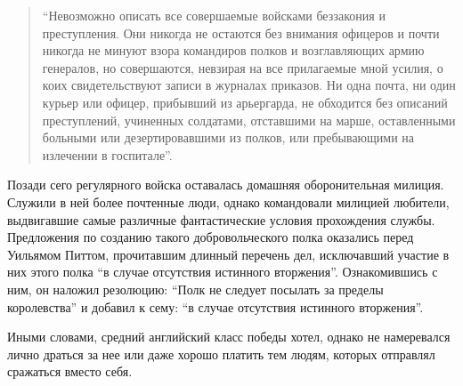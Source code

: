 \documentclass[
  oneside,
  12pt,
  titlepage]{book}
\begin{document}
\begin{quote}
``Невозможно описать все совершаемые войсками беззакония и преступления. Они никогда не остаются без внимания офицеров и почти никогда не минуют взора командиров полков и возглавляющих армию генералов, но совершаются, невзирая на все прилагаемые мной усилия, о коих свидетельствуют записи в журналах приказов. Ни одна почта, ни один курьер или офицер, прибывший из арьергарда, не обходится без описаний преступлений, учиненных солдатами, отставшими на марше, оставленными больными или дезертировавшими из полков, или пребывающими на излечении в госпитале''.
\end{quote}

Позади сего регулярного войска оставалась домашняя оборонительная милиция. Служили в ней более почтенные люди, однако командовали милицией любители, выдвигавшие самые различные фантастические условия прохождения службы. Предложения по созданию такого добровольческого полка оказались перед Уильямом Питтом, прочитавшим длинный перечень дел, исключавший участие в них этого полка ``в случае отсутствия истинного вторжения''. Ознакомившись с ним, он наложил резолюцию: ``Полк не следует посылать за пределы королевства'' и добавил к сему: ``в случае отсутствия истинного вторжения''.

Иными словами, средний английский класс победы хотел, однако не намеревался лично драться за нее или даже хорошо платить тем людям, которых отправлял сражаться вместо себя.
\end{document}
